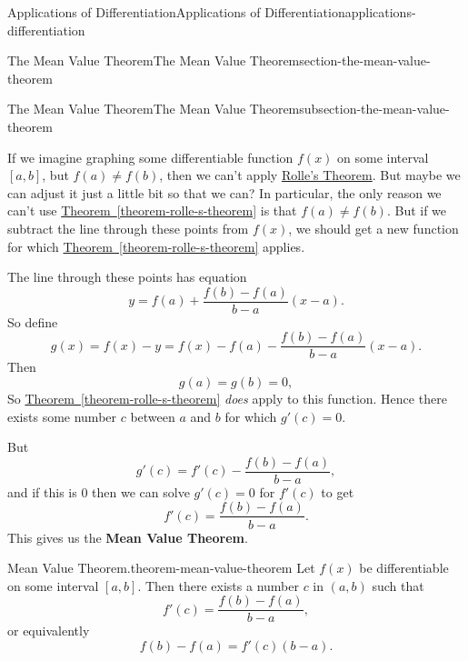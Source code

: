 \documentclass[oneside,10pt,]{book}
\newcommand{\terminology}[1]{\textbf{#1}}
\numberwithin{equation}{section}
\begin{document}
\begin{chapterptx}{Applications of Differentiation}{}{Applications of Differentiation}{}{}{applications-differentiation}
\begin{sectionptx}{The Mean Value Theorem}{}{The Mean Value Theorem}{}{}{section-the-mean-value-theorem}
\begin{subsectionptx}{The Mean Value Theorem}{}{The Mean Value Theorem}{}{}{subsection-the-mean-value-theorem}
\par
\hypertarget{p-335}{}%
If we imagine graphing some differentiable function \(f(x)\) on some interval \([a,b]\), but \(f(a)\neq f(b)\), then we can't apply \hyperref[theorem-rolle-s-theorem]{Rolle's Theorem}. But maybe we can adjust it just a little bit so that we can? In particular, the only reason we can't use \hyperref[theorem-rolle-s-theorem]{Theorem~\ref{theorem-rolle-s-theorem}} is that \(f(a)\neq f(b)\). But if we subtract the line through these points from \(f(x)\), we should get a new function for which \hyperref[theorem-rolle-s-theorem]{Theorem~\ref{theorem-rolle-s-theorem}} applies.%
\par
\hypertarget{p-336}{}%
The line through these points has equation%
\begin{equation*}
y = f(a) + \frac{f(b) - f(a)}{b-a}(x-a).
\end{equation*}
So define%
\begin{equation*}
g(x) = f(x) - y = f(x) - f(a) - \frac{f(b) - f(a)}{b-a}(x-a).
\end{equation*}
Then%
\begin{equation*}
g(a) = g(b) = 0,
\end{equation*}
So \hyperref[theorem-rolle-s-theorem]{Theorem~\ref{theorem-rolle-s-theorem}} \emph{does} apply to this function. Hence there exists some number \(c\) between \(a\) and \(b\) for which \(g'(c) = 0\).%
\par
\hypertarget{p-337}{}%
But%
\begin{equation*}
g'(c) = f'(c) - \frac{f(b) - f(a)}{b-a},
\end{equation*}
and if this is \(0\) then we can solve \(g'(c) = 0\) for \(f'(c)\) to get%
\begin{equation*}
f'(c) = \frac{f(b) - f(a)}{b-a}.
\end{equation*}
This gives us the \terminology{Mean Value Theorem}.%
\begin{theorem}{Mean Value Theorem.}{}{theorem-mean-value-theorem}%
\hypertarget{p-338}{}%
Let \(f(x)\) be differentiable on some interval \([a,b]\). Then there exists a number \(c\) in \((a,b)\) such that%
\begin{equation*}
f'(c) = \frac{f(b) - f(a)}{b-a},
\end{equation*}
or equivalently%
\begin{equation*}
f(b) - f(a) = f'(c)(b-a).
\end{equation*}
%
\end{theorem}
\hypertarget{p-339}{}%

\end{subsectionptx}
\end{sectionptx}
\end{chapterptx}
\end{document}
